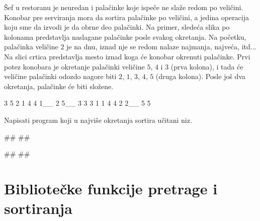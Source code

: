 \begin{Exercise}[difficulty=2, label=516]
  Šef u restoranu je neuredan i palačinke koje ispeče ne slaže redom
  po veličini. Konobar pre serviranja mora da sortira palačinke po
  veličini, a jedina operacija koju sme da izvodi je da obrne deo
  palačinki. Na primer, sledeća slika po kolonama predstavlja
  naslagane palačinke posle svakog okretanja. Na početku, palačinka
  veličine $2$ je na dnu, iznad nje se redom nalaze najmanja, najveća,
  itd... Na slici crtica predstavlja mesto iznad koga će konobar
  okrenuti palačinke. Prvi potez konobara je okretanje palačinki
  veličine $5$, $4$ i $3$ (prva kolona), i tada će veličine palačinki
  odozdo nagore biti $2$, $1$, $3$, $4$, $5$ (druga kolona). Posle još
  dva okretanja, palačinke će biti složene.
\begin{ckod}
    3    5    2    1
    4    4    1__  2
    5__  3    3    3
    1    1    4    4
    2    2__  5    5
\end{ckod}
Napisati program koji u najviše  okretanja sortira učitani
niz. 

\begin{maxitest}
\begin{test}{1}
#\naslovUlaz#
##

#\naslovIzlaz#
##
\end{test}
\end{maxitest}

\end{Exercise}

\section{Bibliotečke funkcije pretrage i sortiranja}

